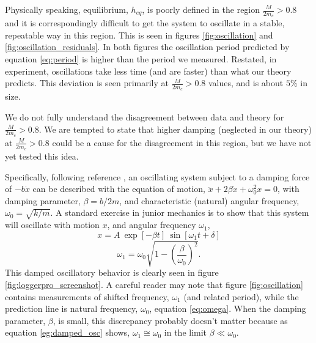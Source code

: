 \documentclass[12pt]{iopart}
\newcommand{\be}{\begin{equation}}
\newcommand{\ee}{\end{equation}}
\begin{document}

Physically speaking, equilibrium, $h_{eq}$, is poorly defined in the region $\frac{M}{2m_c}>0.8$ and it is correspondingly difficult to get the system to oscillate in a stable, repeatable way in this region.  This is seen in  figures \ref{fig:oscillation} and \ref{fig:oscillation_residuals}.  In both figures the oscillation period predicted by equation \ref{eq:period} is higher than the period we measured. Restated, in experiment, oscillations take less time (and are faster) than what our theory predicts.  This deviation is seen primarily at $\frac{M}{2m_c}>0.8$ values, and is about $5\%$ in size.  

We do not fully understand the disagreement between data and theory for $\frac{M}{2m_c}>0.8$. We are tempted to state that  higher damping (neglected in our theory) at $\frac{M}{2m_c}>0.8$ could be a cause for the disagreement  in this region, but we have not yet tested this idea.  


%
%
Specifically, following reference \cite{Mechanics_reference}, an oscillating system subject to a damping force of $-b\dot{x}$ can be described with the equation of motion,
$\ddot{x} + 2 \beta \dot{x} + \omega_0^2 x = 0$,
with damping parameter, $\beta=b/2m$, 
and characteristic (natural) angular frequency, $\omega_0=\sqrt{k/m}$.
A standard exercise in junior mechanics is to show that this system will oscillate with motion $x$, and angular frequency $\omega_1$,
\be
x = A~\exp\left[-\beta t\right] ~\sin\left[ \omega_1 t+\delta \right]
\label{eq:damped_osc_y}
\ee
\be
\omega_1 = \omega_0 \sqrt{1 - \left( \frac{\beta}{\omega_0} \right)^2 }.
\label{eg:damped_osc}
\ee
This damped oscillatory behavior is clearly seen in figure \ref{fig:loggerpro_screenshot}.  A careful reader may note that figure \ref{fig:oscillation} contains measurements of shifted frequency, $\omega_1$ (and related period), while the prediction line is natural frequency, $\omega_0$, equation \ref{eq:omega}.  When the damping parameter, $\beta$, is  small, this discrepancy probably doesn't matter because as equation \ref{eg:damped_osc} shows, $\omega_1 \cong \omega_0$ in the limit $\beta\ll \omega_0$.
\end{document}
